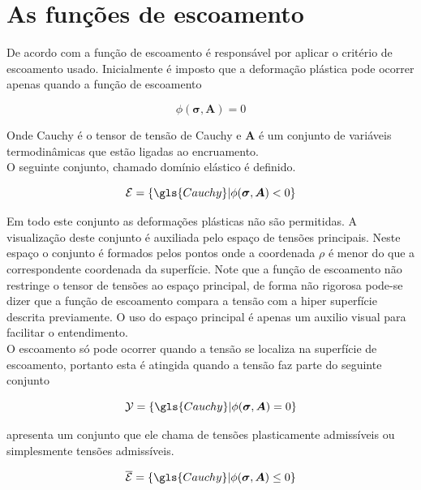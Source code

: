 \section{As funções de escoamento}

De acordo com \cite{neto_peric_owens_2008} a função de escoamento é responsável por aplicar o critério de escoamento usado. Inicialmente é imposto que a deformação plástica pode ocorrer apenas quando a função de escoamento   

\begin{equation}
     \phi(\boldsymbol{\sigma}, \boldsymbol{A}) = 0 
\end{equation}

Onde \gls{Cauchy} é o tensor de tensão de Cauchy e $\boldsymbol{A}$ é um conjunto de variáveis termodinâmicas que estão ligadas ao encruamento.\\

O seguinte conjunto, chamado domínio elástico é definido. 

\begin{equation}
    \mathcal{E} = \{ \gls{Cauchy} | \phi(\boldsymbol{\sigma}, \boldsymbol{A}) < 0   \}
\end{equation}

Em todo este conjunto as deformações plásticas não são permitidas. A visualização deste conjunto é auxiliada pelo espaço de tensões principais. Neste espaço o conjunto é formados pelos pontos onde a coordenada $\rho$ é menor do que a correspondente coordenada da superfície. Note que a função de escoamento não restringe o tensor de tensões ao espaço principal, de forma não rigorosa pode-se dizer que a função de escoamento compara a tensão com a hiper superfície descrita previamente. O uso do espaço principal é apenas um auxilio visual para facilitar o entendimento. \\

O escoamento só pode ocorrer quando a tensão se localiza na superfície de escoamento, portanto esta é atingida quando a tensão faz parte do seguinte conjunto 

\begin{equation}
    \mathcal{Y} = \{ \gls{Cauchy} | \phi(\boldsymbol{\sigma}, \boldsymbol{A}) = 0   \}
\end{equation}


\cite{neto_peric_owens_2008} apresenta um conjunto que ele chama de tensões plasticamente admissíveis ou simplesmente tensões admissíveis.

\begin{equation}
    \overline{\mathcal{E}} = \{ \gls{Cauchy} | \phi(\boldsymbol{\sigma}, \boldsymbol{A}) \leq 0   \}
\end{equation}


